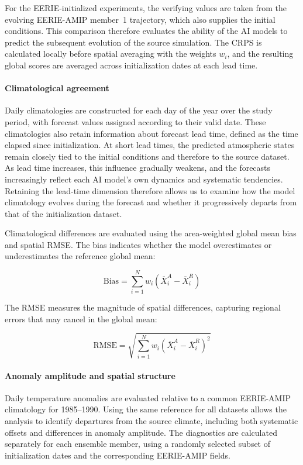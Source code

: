 For the EERIE-initialized experiments, the verifying values are taken from the evolving EERIE-AMIP member~1 trajectory, which also supplies the initial conditions. This comparison therefore evaluates the ability of the AI models to predict the subsequent evolution of the source simulation. The CRPS is calculated locally before spatial averaging with the weights $w_i$, and the resulting global scores are averaged across initialization dates at each lead time.

\paragraph{Climatological agreement}

Daily climatologies are constructed for each day of the year over the study period, with forecast values assigned according to their valid date. These climatologies also retain information about forecast lead time, defined as the time elapsed since initialization. At short lead times, the predicted atmospheric states remain closely tied to the initial conditions and therefore to the source dataset. As lead time increases, this influence gradually weakens, and the forecasts increasingly reflect each AI model's own dynamics and systematic tendencies. Retaining the lead-time dimension therefore allows us to examine how the model climatology evolves during the forecast and whether it progressively departs from that of the initialization dataset.

Climatological differences are evaluated using the area-weighted global mean bias and spatial RMSE. The bias indicates whether the model overestimates or underestimates the reference global mean:

$$
\mathrm{Bias}
=
\sum_{i=1}^{N} w_i
\left(\overline{X}^{A}_{i}-\overline{X}^{R}_{i}\right)
$$

The RMSE measures the magnitude of spatial differences, capturing regional errors that may cancel in the global mean:

\begin{equation}
    \mathrm{RMSE}
    =
    \sqrt{
    \sum_{i=1}^{N} w_i
    \left(\overline{X}^{A}_{i}-\overline{X}^{R}_{i}\right)^2
    } 
\end{equation}


\paragraph{Anomaly amplitude and spatial structure}
Daily temperature anomalies are evaluated relative to a common EERIE-AMIP climatology for 1985--1990. Using the same reference for all datasets allows the analysis to identify departures from the source climate, including both systematic offsets and differences in anomaly amplitude. The diagnostics are calculated separately for each ensemble member, using a randomly selected subset of initialization dates and the corresponding EERIE-AMIP fields.

